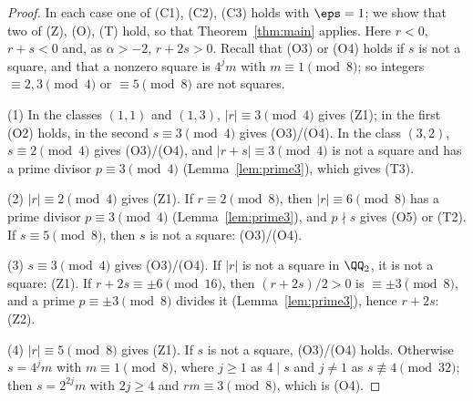 \begin{proof}
  \leanok
  In each case one of (C1), (C2), (C3) holds with $\eps = 1$; we show that two of (Z), (O), (T)
  hold, so that Theorem~\ref{thm:main} applies. Here $r < 0$, $r + s < 0$ and, as $\alpha > -2$,
  $r + 2s > 0$. Recall that (O3) or (O4) holds if $s$ is not a square, and that a nonzero square
  is $4^j m$ with $m \equiv 1 \pmod 8$; so integers $\equiv 2, 3 \pmod 4$ or $\equiv 5 \pmod 8$
  are not squares.

  (1) In the classes $(1, 1)$ and $(1, 3)$, $|r| \equiv 3 \pmod 4$ gives (Z1); in the first (O2)
  holds, in the second $s \equiv 3 \pmod 4$ gives (O3)/(O4). In the class $(3, 2)$,
  $s \equiv 2 \pmod 4$ gives (O3)/(O4), and $|r + s| \equiv 3 \pmod 4$ is not a square and has a
  prime divisor $p \equiv 3 \pmod 4$ (Lemma~\ref{lem:prime3}), which gives (T3).

  (2) $|r| \equiv 2 \pmod 4$ gives (Z1). If $r \equiv 2 \pmod 8$, then $|r| \equiv 6 \pmod 8$ has a
  prime divisor $p \equiv 3 \pmod 4$ (Lemma~\ref{lem:prime3}), and $p \nmid s$ gives (O5) or (T2).
  If $s \equiv 5 \pmod 8$, then $s$ is not a square: (O3)/(O4).

  (3) $s \equiv 3 \pmod 4$ gives (O3)/(O4). If $|r|$ is not a square in $\QQ_2$, it is not a square:
  (Z1). If $r + 2s \equiv \pm 6 \pmod{16}$, then $(r + 2s)/2 > 0$ is $\equiv \pm 3 \pmod 8$, and a
  prime $p \equiv \pm 3 \pmod 8$ divides it (Lemma~\ref{lem:prime3}), hence $r + 2s$: (Z2).

  (4) $|r| \equiv 5 \pmod 8$ gives (Z1). If $s$ is not a square, (O3)/(O4) holds. Otherwise
  $s = 4^j m$ with $m \equiv 1 \pmod 8$, where $j \ge 1$ as $4 \mid s$ and $j \ne 1$ as
  $s \not\equiv 4 \pmod{32}$; then $s = 2^{2j} m$ with $2j \ge 4$ and $rm \equiv 3 \pmod 8$,
  which is (O4).
\end{proof}

